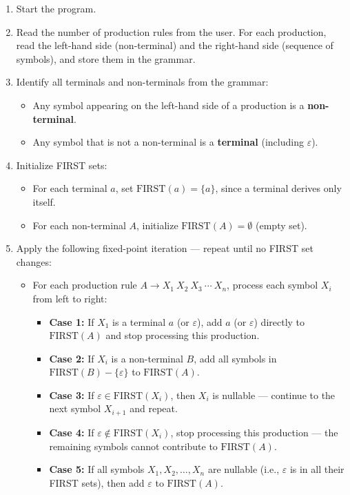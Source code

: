 \documentclass[12pt]{article}
\begin{document}
\begin{enumerate}
    \item Start the program.

    \item Read the number of production rules from the user. For each production, read the left-hand side (non-terminal) and the right-hand side (sequence of symbols), and store them in the grammar.

    \item Identify all terminals and non-terminals from the grammar:
    \begin{itemize}
        \item Any symbol appearing on the left-hand side of a production is a \textbf{non-terminal}.
        \item Any symbol that is not a non-terminal is a \textbf{terminal} (including $\varepsilon$).
    \end{itemize}

    \item Initialize FIRST sets:
    \begin{itemize}
        \item For each terminal $a$, set $\text{FIRST}(a) = \{a\}$, since a terminal derives only itself.
        \item For each non-terminal $A$, initialize $\text{FIRST}(A) = \emptyset$ (empty set).
    \end{itemize}

    \item Apply the following fixed-point iteration — repeat until no FIRST set changes:
    \begin{itemize}
        \item For each production rule $A \rightarrow X_1\ X_2\ X_3\ \cdots\ X_n$, process each symbol $X_i$ from left to right:
        \begin{itemize}
            \item \textbf{Case 1:} If $X_1$ is a terminal $a$ (or $\varepsilon$), add $a$ (or $\varepsilon$) directly to $\text{FIRST}(A)$ and stop processing this production.
            \item \textbf{Case 2:} If $X_i$ is a non-terminal $B$, add all symbols in $\text{FIRST}(B) - \{\varepsilon\}$ to $\text{FIRST}(A)$.
            \item \textbf{Case 3:} If $\varepsilon \in \text{FIRST}(X_i)$, then $X_i$ is nullable — continue to the next symbol $X_{i+1}$ and repeat.
            \item \textbf{Case 4:} If $\varepsilon \notin \text{FIRST}(X_i)$, stop processing this production — the remaining symbols cannot contribute to $\text{FIRST}(A)$.
            \item \textbf{Case 5:} If all symbols $X_1, X_2, \ldots, X_n$ are nullable (i.e., $\varepsilon$ is in all their FIRST sets), then add $\varepsilon$ to $\text{FIRST}(A)$.
        \end{itemize}
    \end{itemize}


\end{enumerate}
\end{document}
